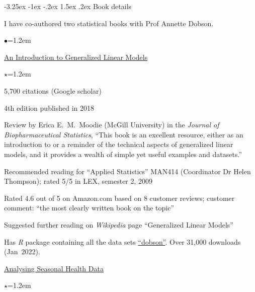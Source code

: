 \documentclass[a4paper,11pt]{article}
\makeatletter
\renewcommand\subsection{\@startsection{subsection}{2}{\z@}%
                                       {-3.25ex \@plus -1ex \@minus -.2ex}%
                                       {1.5ex \@plus .2ex}%
                                   {\normalfont\normalsize\bfseries\color{blue}}}
\renewcommand{\labelitemi}{$\bullet$}
\renewcommand{\labelitemii}{$\star$}
\makeatother
\begin{document}
\begin{raggedright}


\subsection{Book details}

I have co-authored two statistical books with Prof Annette Dobson.
\begin{list}{\labelitemi}{\leftmargin=1.2em}\addtolength{\itemsep}{-0.5\baselineskip}
\item \href{http://www.crcpress.com/product/isbn/9781584889502}{An Introduction to Generalized Linear Models}
\begin{list}{\labelitemii}{\leftmargin=1.2em}\addtolength{\itemsep}{-0.3\baselineskip}
\item 5,700 citations (Google scholar)
\item 4th edition published in 2018
\item Review by Erica E.\ M.\ Moodie (McGill University) in the \textit{Journal of Biopharmaceutical Statistics}, ``This book is an excellent resource, either as an introduction to or a reminder of the technical aspects of generalized linear models, and it provides a wealth of simple yet useful examples and datasets.''
\item Recommended reading for ``Applied Statistics'' MAN414 (Coordinator Dr Helen Thompson); rated 5/5 in LEX, semester 2, 2009
\item Rated 4.6 out of 5 on Amazon.com based on 8 customer reviews; customer comment: ``the most clearly written book on the topic''
\item Suggested further reading on \textit{Wikipedia} page ``Generalized Linear Models''
\item Has \textit{R} package containing all the data sets \href{http://cran.r-project.org/web/packages/dobson/index.html}{``dobson''}. Over 31,000 downloads (Jan~2022). %
\end{list}
\item \href{http://www.springer.com/statistics/stats+life+sci/book/978-3-642-10747-4}{Analysing Seasonal Health Data}
\begin{list}{\labelitemii}{\leftmargin=1.2em}\addtolength{\itemsep}{-0.3\baselineskip}

\end{list}
\end{list}
\end{raggedright}
\end{document}
